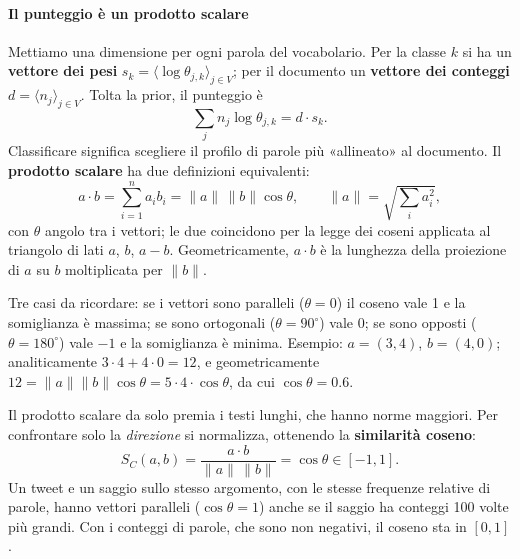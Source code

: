 \documentclass[12pt]{extarticle}
\begin{document}
\paragraph{Il punteggio è un prodotto scalare}
Mettiamo una dimensione per ogni parola del vocabolario. Per la classe $k$ si ha un \textbf{vettore dei pesi} $s_k=\langle \log\theta_{j,k}\rangle_{j\in V}$; per il documento un \textbf{vettore dei conteggi} $d=\langle n_j\rangle_{j\in V}$. Tolta la prior, il punteggio è
\[
\sum_j n_j \log\theta_{j,k} = d\cdot s_k .
\]
Classificare significa scegliere il profilo di parole più «allineato» al documento. Il \textbf{prodotto scalare} ha due definizioni equivalenti:
\[
a\cdot b = \sum_{i=1}^n a_i b_i = \|a\|\,\|b\|\cos\theta,
\qquad \|a\|=\sqrt{\sum_i a_i^2},
\]
con $\theta$ angolo tra i vettori; le due coincidono per la legge dei coseni applicata al triangolo di lati $a$, $b$, $a-b$. Geometricamente, $a\cdot b$ è la lunghezza della proiezione di $a$ su $b$ moltiplicata per $\|b\|$.

\begin{center}
\end{center}

\noindent Tre casi da ricordare: se i vettori sono paralleli ($\theta=0$) il coseno vale 1 e la somiglianza è massima; se sono ortogonali ($\theta=90^\circ$) vale 0; se sono opposti ($\theta=180^\circ$) vale $-1$ e la somiglianza è minima. Esempio: $a=(3,4)$, $b=(4,0)$; analiticamente $3\cdot4+4\cdot0=12$, e geometricamente $12=\|a\|\|b\|\cos\theta=5\cdot4\cdot\cos\theta$, da cui $\cos\theta=0.6$.

\noindent Il prodotto scalare da solo premia i testi lunghi, che hanno norme maggiori. Per confrontare solo la \emph{direzione} si normalizza, ottenendo la \textbf{similarità coseno}:
\[
S_C(a,b) = \frac{a\cdot b}{\|a\|\,\|b\|} = \cos\theta \in [-1,1].
\]
Un tweet e un saggio sullo stesso argomento, con le stesse frequenze relative di parole, hanno vettori paralleli ($\cos\theta=1$) anche se il saggio ha conteggi 100 volte più grandi. Con i conteggi di parole, che sono non negativi, il coseno sta in $[0,1]$.
\end{document}

